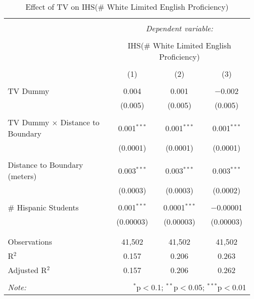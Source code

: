 
\begin{table}[!htbp] \centering 
  \caption{Effect of TV on IHS(\# White Limited English Proficiency)} 
  \label{} 
\begin{tabular}{@{\extracolsep{-2pt}}lccc} 
\\[-1.8ex]\hline 
\hline \\[-1.8ex] 
 & \multicolumn{3}{c}{\textit{Dependent variable:}} \\ 
\cline{2-4} 
\\[-1.8ex] & \multicolumn{3}{c}{IHS(\# White Limited English Proficiency)} \\ 
\\[-1.8ex] & (1) & (2) & (3)\\ 
\hline \\[-1.8ex] 
 TV Dummy & 0.004 & 0.001 & $-$0.002 \\ 
  & (0.005) & (0.005) & (0.005) \\ 
  & & & \\ 
 TV Dummy $\times$ Distance to Boundary & 0.001$^{***}$ & 0.001$^{***}$ & 0.001$^{***}$ \\ 
  & (0.0001) & (0.0001) & (0.0001) \\ 
  & & & \\ 
 Distance to Boundary (meters) & 0.003$^{***}$ & 0.003$^{***}$ & 0.003$^{***}$ \\ 
  & (0.0003) & (0.0003) & (0.0002) \\ 
  & & & \\ 
 \# Hispanic Students & 0.001$^{***}$ & 0.0001$^{***}$ & $-$0.00001 \\ 
  & (0.00003) & (0.00003) & (0.00003) \\ 
  & & & \\ 
\hline \\[-1.8ex] 
Observations & 41,502 & 41,502 & 41,502 \\ 
R$^{2}$ & 0.157 & 0.206 & 0.263 \\ 
Adjusted R$^{2}$ & 0.157 & 0.206 & 0.262 \\ 
\hline 
\hline \\[-1.8ex] 
\textit{Note:}  & \multicolumn{3}{r}{$^{*}$p$<$0.1; $^{**}$p$<$0.05; $^{***}$p$<$0.01} \\ 
\end{tabular} 
\end{table} 
